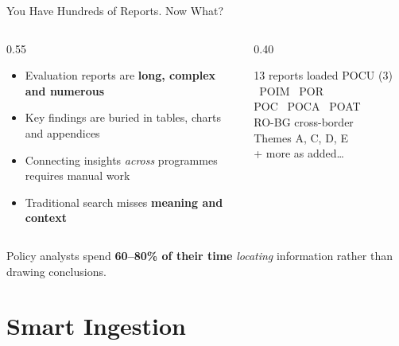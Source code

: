 \documentclass[aspectratio=169,11pt]{beamer}
\begin{document}
\begin{frame}{You Have Hundreds of Reports. Now What?}
  \vspace{0.2cm}
  \begin{columns}[t]
    \begin{column}{0.55\textwidth}
      \medskip
      \begin{itemize}\setlength\itemsep{10pt}
        \item Evaluation reports are \textbf{long, complex and numerous}
        \item Key findings are buried in tables, charts and appendices
        \item Connecting insights \emph{across} programmes requires manual work
        \item Traditional search misses \textbf{meaning and context}
      \end{itemize}
    \end{column}
    \begin{column}{0.40\textwidth}
      \medskip
      \begin{block}{\small 13 reports loaded}
        \footnotesize
        POCU (3) \textbullet\ POIM \textbullet\ POR\\[3pt]
        POC \textbullet\ POCA \textbullet\ POAT\\[3pt]
        RO-BG cross-border\\[3pt]
        Themes A, C, D, E\\[3pt]
        \textcolor{midgray}{+ more as added\ldots}
      \end{block}
    \end{column}
  \end{columns}
  \vspace{0.5cm}
  \begin{center}
    \colorbox{lightcoral!60}{%
      \parbox{0.82\textwidth}{\centering\small
        Policy analysts spend \textbf{60--80\% of their time}
        \emph{locating} information rather than drawing conclusions.
      }%
    }
  \end{center}
\end{frame}

\section{Smart Ingestion}
\end{document}
